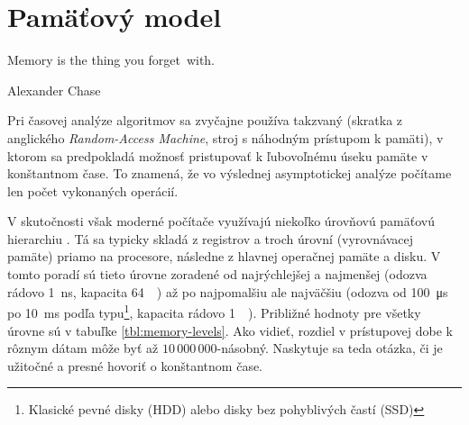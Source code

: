 \chapter{Pamäťový model}
\epigraph{Memory is the thing you forget~with.}{Alexander Chase}

Pri časovej analýze algoritmov sa zvyčajne používa takzvaný \RAM {}(skratka z anglického \emph{Random-Access Machine}, stroj s náhodným prístupom k pamäti), v ktorom sa predpokladá možnosť pristupovať k ľubovoľnému úseku pamäte v konštantnom čase. To znamená, že vo výslednej asymptotickej analýze počítame len počet vykonaných operácií.

V skutočnosti však moderné počítače využívajú niekoľko úrovňovú pamäťovú hierarchiu \citep{drepper2007every}. Tá sa typicky skladá z registrov a troch úrovní \cache (vyrovnávacej pamäte) priamo na procesore, následne z hlavnej operačnej pamäte a disku. V tomto poradí sú tieto úrovne zoradené od najrýchlejšej a najmenšej (odozva rádovo \SI{1}{\nano\second}, kapacita \SI{64}{\kibi\byte}) až po najpomalšiu ale najväčšiu (odozva od \SI{100}{\micro\second} po \SI{10}{\milli\second} podľa typu\footnote{Klasické pevné disky (HDD) alebo disky bez pohyblivých častí (SSD)}, kapacita rádovo \SI{1}{\tebi\byte}). Približné hodnoty pre všetky úrovne sú v tabuľke \ref{tbl:memory-levels}. Ako vidieť, rozdiel v prístupovej dobe k rôznym dátam môže byť až $10\,000\,000$-násobný. Naskytuje sa teda otázka, či je užitočné a presné hovoriť o konštantnom čase.

